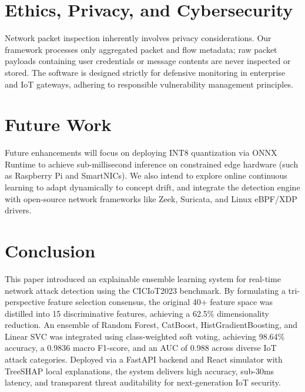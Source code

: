 \documentclass[conference]{IEEEtran}
\begin{document}
\section{Ethics, Privacy, and Cybersecurity}
Network packet inspection inherently involves privacy considerations. Our framework processes only aggregated packet and flow metadata; raw packet payloads containing user credentials or message contents are never inspected or stored. The software is designed strictly for defensive monitoring in enterprise and IoT gateways, adhering to responsible vulnerability management principles.

\section{Future Work}
Future enhancements will focus on deploying INT8 quantization via ONNX Runtime to achieve sub-millisecond inference on constrained edge hardware (such as Raspberry Pi and SmartNICs). We also intend to explore online continuous learning to adapt dynamically to concept drift, and integrate the detection engine with open-source network frameworks like Zeek, Suricata, and Linux eBPF/XDP drivers.

\section{Conclusion}
This paper introduced an explainable ensemble learning system for real-time network attack detection using the CICIoT2023 benchmark. By formulating a tri-perspective feature selection consensus, the original 40+ feature space was distilled into 15 discriminative features, achieving a 62.5\% dimensionality reduction. An ensemble of Random Forest, CatBoost, HistGradientBoosting, and Linear SVC was integrated using class-weighted soft voting, achieving 98.64\% accuracy, a 0.9836 macro F1-score, and an AUC of 0.988 across diverse IoT attack categories. Deployed via a FastAPI backend and React simulator with TreeSHAP local explanations, the system delivers high accuracy, sub-30ms latency, and transparent threat auditability for next-generation IoT security.
\end{document}
